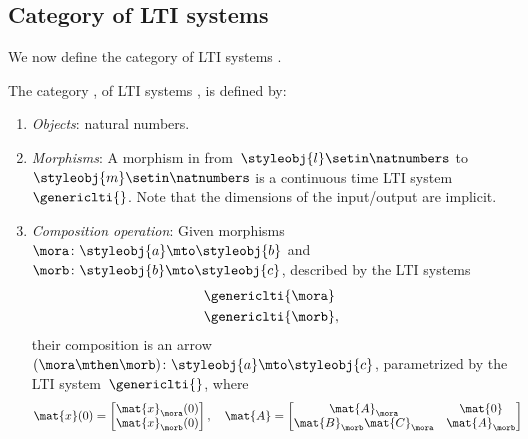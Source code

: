 \subsection{Category of LTI systems}
We now define the category of LTI systems \LTI.

\begin{ctdefinition}
    \label{def:LTICat}
    The category \LTI, of LTI systems \iindex{\LTI}, is defined by:
    \begin{enumerate}
        \item \emph{Objects}: natural numbers.
        \item \emph{Morphisms}: A morphism in \LTI from~$\styleobj{l}\setin \natnumbers$ to~$\styleobj{m}\setin \natnumbers$ is a continuous time LTI system~$\genericlti{}$.
              Note that the dimensions of the input/output are implicit.
        \item \emph{Composition operation}: Given morphisms~$\mora \colon \styleobj{a}\mto \styleobj{b}$ and~$\morb\colon \styleobj{b}\mto \styleobj{c}$, described by the LTI systems
              \begin{equation*}
                  \begin{aligned}
                       & \genericlti{\mora} \\
                       & \genericlti{\morb},
                  \end{aligned}
              \end{equation*}
              their composition is an arrow~$(\mora \mthen \morb)\colon \styleobj{a}\mto \styleobj{c}$, parametrized by the LTI system~$\genericlti{}$, where
              \begin{equation}
                  \begin{aligned}
                      \mat{x}(0) & =\begin{bmatrix}
                                        \mat{x}_\mora(0) \\
                                        \mat{x}_\morb(0) \\
                                    \end{bmatrix},\quad
                      \mat{A}=\begin{bmatrix}
                                  \mat{A}_\mora              & \mat{0}       \\
                                  \mat{B}_\morb\mat{C}_\mora & \mat{A}_\morb

\end{bmatrix}
\end{aligned}
\end{equation}
\end{enumerate}
\end{ctdefinition}
